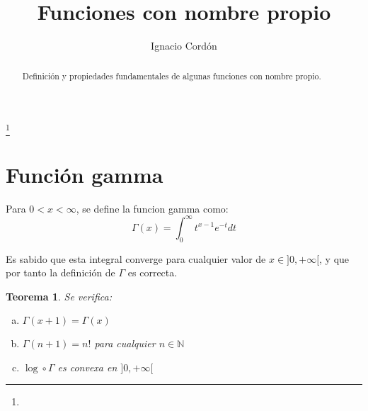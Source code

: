 \documentclass[a4paper, 11pt]{amsart}
\newtheorem{theorem}{Teorema}[section]
\theoremstyle{definition}
\theoremstyle{remark}
\numberwithin{equation}{section}
\begin{document}
\title{Funciones con nombre propio}


\author{Ignacio Cordón}
\address{}
\curraddr{}
\email{}
\thanks{}


\keywords{}

\date{}

\dedicatory{}


\begin{abstract}
  Definición y propiedades fundamentales de algunas funciones con nombre propio.
\end{abstract}

\maketitle

  \section{Función gamma}
  
  Para $0 < x < \infty$, se define la funcion gamma como: 
      $$\Gamma(x) = \int_0^{\infty}{t^{x-1}e^{-t}dt}$$
      
  Es sabido que esta integral converge para cualquier valor de $x\in]0,+\infty[$, y que por tanto la definición de 
  $\Gamma$ es correcta.\\
  
  \begin{theorem}
    Se verifica:
      \begin{enumerate}[(a)]
	\item $\Gamma(x+1) = \Gamma(x)$
	\item $\Gamma(n+1) = n!$ para cualquier $n\in \mathbb{N}$
	\item $\log \circ \Gamma$ es convexa en $]0,+\infty[$
      \end{enumerate}
  \end{theorem}
  
\end{document}
